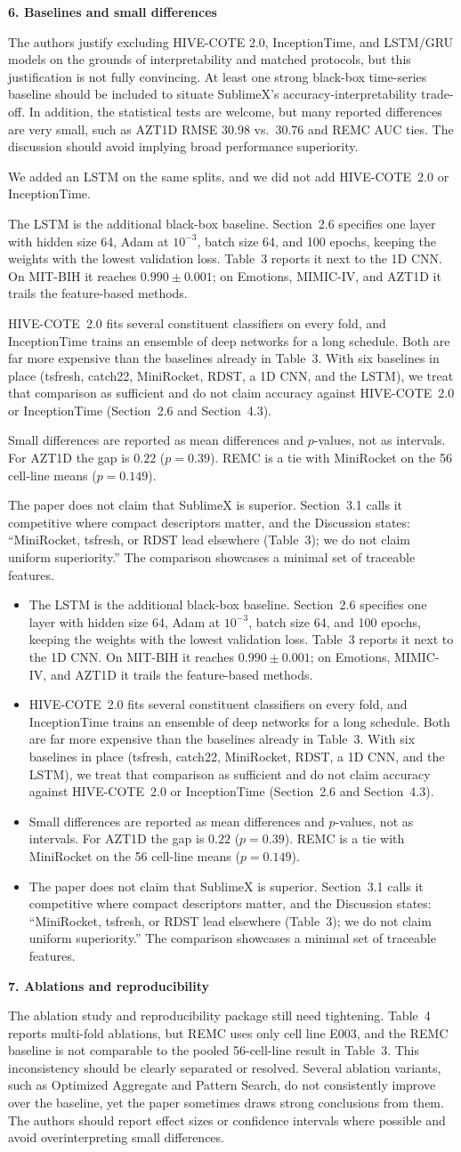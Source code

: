 \documentclass[11pt]{article}
\makeatletter
\newcommand{\rsp}{\par\vspace{0.9em}}
\newcommand{\rcitem}[2]{\begin{reviewerbox}\textbf{#1}\par\smallskip#2\end{reviewerbox}}
\newcommand{\response}[2]{%
  \begin{responsebox}#1%
  \def\@responseitems{#2}%
  \ifx\@responseitems\empty\else\begin{itemize}[nosep,leftmargin=1.2em]#2\end{itemize}\fi
  \end{responsebox}\rsp}
\makeatother
\begin{document}
\rcitem{6. Baselines and small differences}{The authors justify excluding HIVE-COTE 2.0,
InceptionTime, and LSTM/GRU models on the grounds of interpretability and matched protocols, but this
justification is not fully convincing. At least one strong black-box time-series baseline should be
included to situate SublimeX's accuracy-interpretability trade-off. In addition, the statistical tests
are welcome, but many reported differences are very small, such as AZT1D RMSE 30.98 vs.\ 30.76 and
REMC AUC ties. The discussion should avoid implying broad performance superiority.}

\response{We added an LSTM on the same splits, and we did not add HIVE-COTE~2.0 or InceptionTime.}{
  \item The LSTM is the additional black-box baseline. Section~2.6 specifies one layer with hidden
    size 64, Adam at $10^{-3}$, batch size 64, and 100 epochs, keeping the weights with the lowest
    validation loss. Table~3 reports it next to the 1D CNN. On MIT-BIH it reaches $0.990\pm0.001$;
    on Emotions, MIMIC-IV, and AZT1D it trails the feature-based methods.
  \item HIVE-COTE~2.0 fits several constituent classifiers on every fold, and InceptionTime trains
    an ensemble of deep networks for a long schedule. Both are far more expensive than the baselines
    already in Table~3. With six baselines in place (tsfresh, catch22, MiniRocket, RDST, a 1D CNN,
    and the LSTM), we treat that comparison as sufficient and do not claim accuracy against
    HIVE-COTE~2.0 or InceptionTime (Section~2.6 and Section~4.3).
  \item Small differences are reported as mean differences and $p$-values, not as intervals. For
    AZT1D the gap is $0.22$ ($p=0.39$). REMC is a tie with MiniRocket on the 56
    cell-line means ($p=0.149$).
  \item The paper does not claim that SublimeX is superior. Section~3.1 calls it competitive where
    compact descriptors matter, and the Discussion states: ``MiniRocket, tsfresh, or RDST lead
    elsewhere (Table~3); we do not claim uniform superiority.'' The comparison showcases a minimal
    set of traceable features.
}

\rcitem{7. Ablations and reproducibility}{The ablation study and reproducibility package still need
tightening. Table~4 reports multi-fold ablations, but REMC uses only cell line E003, and the REMC
baseline is not comparable to the pooled 56-cell-line result in Table~3. This inconsistency should be
clearly separated or resolved. Several ablation variants, such as Optimized Aggregate and Pattern
Search, do not consistently improve over the baseline, yet the paper sometimes draws strong
conclusions from them. The authors should report effect sizes or confidence intervals where possible
and avoid overinterpreting small differences.}
\end{document}
